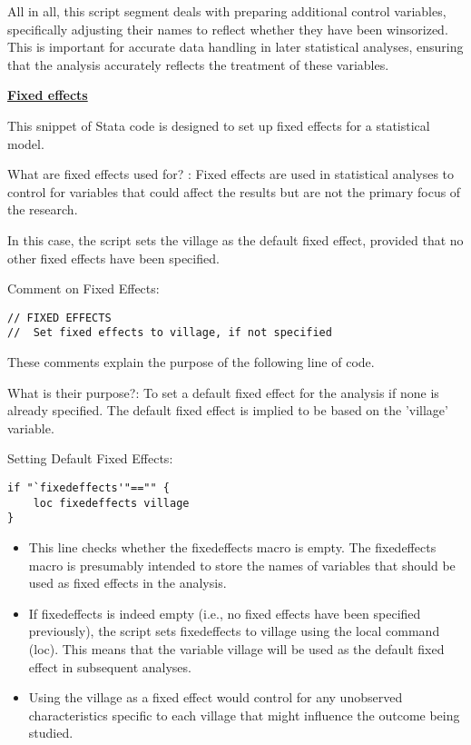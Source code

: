 \documentclass{article}
\begin{document}
All in all, this script segment deals with preparing additional control variables, specifically adjusting their names to reflect whether they have been winsorized. This is important for accurate data handling in later statistical analyses, ensuring that the analysis accurately reflects the treatment of these variables.


\underline{\textbf{Fixed effects}}

This snippet of Stata code is designed to set up fixed effects for a statistical model. \newline

What are fixed effects used for? : Fixed effects are used in statistical analyses to control for variables that could affect the results but are not the primary focus of the research. \newline

In this case, the script sets the village as the default fixed effect, provided that no other fixed effects have been specified. \newline

Comment on Fixed Effects:


\begin{mdframed}
\begin{verbatim}
// FIXED EFFECTS 
// 	Set fixed effects to village, if not specified
\end{verbatim}
\end{mdframed}

These comments explain the purpose of the following line of code. \newline

What is their purpose?: To set a default fixed effect for the analysis if none is already specified. The default fixed effect is implied to be based on the 'village' variable. \newline

Setting Default Fixed Effects:

\begin{mdframed}
\begin{verbatim}
if "`fixedeffects'"=="" {
    loc fixedeffects village 
}
\end{verbatim}
\end{mdframed}

\begin{itemize}
    \item This line checks whether the fixedeffects macro is empty. The fixedeffects macro is presumably intended to store the names of variables that should be used as fixed effects in the analysis.
    \item If fixedeffects is indeed empty (i.e., no fixed effects have been specified previously), the script sets fixedeffects to village using the local command (loc). This means that the variable village will be used as the default fixed effect in subsequent analyses.
	\item Using the village as a fixed effect would control for any unobserved characteristics specific to each village that might influence the outcome being studied.
\end{itemize}
\end{document}
